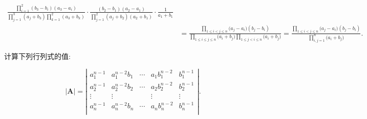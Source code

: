 \documentclass[lang=cn,newtx,10pt,scheme=chinese]{elegantbook}
\begin{document}
\begin{solution}
\begin{align*}
\frac{\prod\limits_{i=1}^2{\left( b_3-b_i \right) \left( a_3-a_i \right)}}{\prod\limits_{j=1}^3{\left( a_j+b_3 \right) \prod\limits_{k=1}^2{\left( a_3+b_k \right)}}}\cdot \frac{\left( b_2-b_1 \right) \left( a_2-a_1 \right)}{\prod\limits_{j=1}^2{\left( a_j+b_2 \right) \left( a_2+b_1 \right)}}\cdot \frac{1}{a_1+b_1}
\\
&=\frac{\prod\limits_{1\le i<j\le n}{(a_j}-a_i)(b_j-b_i)}{\prod\limits_{1\le i\le j\le n}{(a_i}+b_j)\prod\limits_{1\le j<i\le n}{(a_i}+b_j)}=\frac{\prod\limits_{1\le i<j\le n}{(a_j}-a_i)(b_j-b_i)}{\prod\limits_{i,j=1}^n{(a_i}+b_j)}.
\nonumber
\end{align*}
\end{solution}

\begin{proposition}\label{proposition:Vandermode行列式的"卷积"形式}
计算下列行列式的值:

\[
|\boldsymbol{A}|=\left| \begin{matrix}
a_{1}^{n-1}&		a_{1}^{n-2}b_1&		\cdots&		a_1b_{1}^{n-2}&		b_{1}^{n-1}\\
a_{2}^{n-1}&		a_{2}^{n-2}b_2&		\cdots&		a_2b_{2}^{n-2}&		b_{2}^{n-1}\\
\vdots&		\vdots&		&		\vdots&		\vdots\\
a_{n}^{n-1}&		a_{n}^{n-2}b_n&		\cdots&		a_nb_{n}^{n-2}&		b_{n}^{n-1}\\
\end{matrix} \right|.
\]
\end{proposition}
\end{document}
